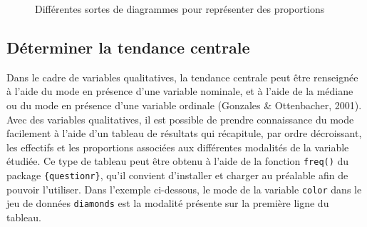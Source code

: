 \documentclass[
  letterpaper,
]{book}
\newenvironment{Shaded}{\begin{snugshade}}{\end{snugshade}}
\newcommand{\AttributeTok}[1]{\textcolor[rgb]{0.40,0.45,0.13}{#1}}
\newcommand{\ConstantTok}[1]{\textcolor[rgb]{0.56,0.35,0.01}{#1}}
\newcommand{\FunctionTok}[1]{\textcolor[rgb]{0.28,0.35,0.67}{#1}}
\newcommand{\NormalTok}[1]{\textcolor[rgb]{0.00,0.23,0.31}{#1}}
\newcommand{\SpecialCharTok}[1]{\textcolor[rgb]{0.37,0.37,0.37}{#1}}
\newcommand{\StringTok}[1]{\textcolor[rgb]{0.13,0.47,0.30}{#1}}
\begin{document}
\begin{figure}


\caption{\label{fig-geombarPropEnhancedGraph}Différentes sortes de
diagrammes pour représenter des proportions}

\end{figure}%

\subsection{Déterminer la tendance
centrale}\label{duxe9terminer-la-tendance-centrale}

Dans le cadre de variables qualitatives, la tendance centrale peut être
renseignée à l'aide du mode en présence d'une variable nominale, et à
l'aide de la médiane ou du mode en présence d'une variable ordinale
(Gonzales \& Ottenbacher, 2001). Avec des variables qualitatives, il est
possible de prendre connaissance du mode facilement à l'aide d'un
tableau de résultats qui récapitule, par ordre décroissant, les
effectifs et les proportions associées aux différentes modalités de la
variable étudiée. Ce type de tableau peut être obtenu à l'aide de la
fonction \texttt{freq()} du package \texttt{\{questionr\}}, qu'il
convient d'installer et charger au préalable afin de pouvoir l'utiliser.
Dans l'exemple ci-dessous, le mode de la variable \texttt{color} dans le
jeu de données \texttt{diamonds} est la modalité présente sur la
première ligne du tableau.

\begin{Shaded}
\end{Shaded}
\end{document}

